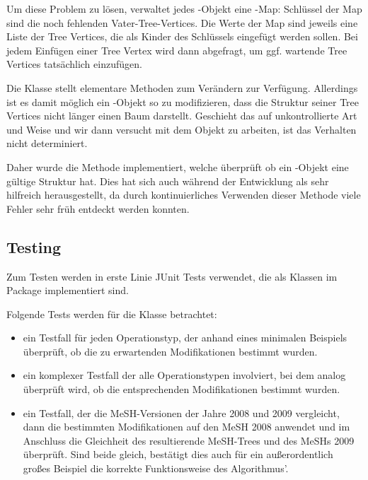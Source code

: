 Um diese Problem zu lösen, verwaltet jedes -Objekt eine -Map: Schlüssel der Map sind die noch fehlenden Vater-Tree-Vertices. Die Werte der Map sind jeweils eine Liste der Tree Vertices, die als Kinder des Schlüssels eingefügt werden sollen. Bei jedem Einfügen einer Tree Vertex wird dann  abgefragt, um ggf. wartende Tree Vertices tatsächlich einzufügen.

Die Klasse  stellt elementare Methoden zum Verändern zur Verfügung. Allerdings ist es damit möglich ein -Objekt so zu modifizieren, dass die Struktur seiner Tree Vertices nicht länger einen Baum darstellt. Geschieht das auf unkontrollierte Art und Weise und wir dann versucht mit dem Objekt zu arbeiten, ist das Verhalten nicht determiniert. \par
Daher wurde die Methode  implementiert, welche überprüft ob ein -Objekt eine gültige Struktur hat. Dies hat sich auch während der Entwicklung als sehr hilfreich herausgestellt, da durch kontinuierliches Verwenden dieser Methode viele Fehler sehr früh entdeckt werden konnten.

\subsection{Testing}
\label{sec:testing}
Zum Testen werden in erste Linie JUnit Tests verwendet, die als Klassen im Package  implementiert sind.\par

Folgende Tests werden für die Klasse  betrachtet: 
\begin{itemize}
\item ein Testfall für jeden Operationstyp, der anhand eines minimalen Beispiels überprüft, ob die zu erwartenden Modifikationen bestimmt wurden.
\item ein komplexer Testfall der alle Operationstypen involviert, bei dem analog überprüft wird, ob die entsprechenden Modifikationen bestimmt wurden.
\item ein Testfall, der die MeSH-Versionen der Jahre 2008 und 2009 vergleicht, dann die bestimmten Modifikationen auf den MeSH 2008 anwendet und im Anschluss die Gleichheit des resultierende MeSH-Trees und des MeSHs 2009 überprüft. Sind beide gleich, bestätigt dies auch für ein außerordentlich großes Beispiel die korrekte Funktionsweise des Algorithmus'. 
\end{itemize}

